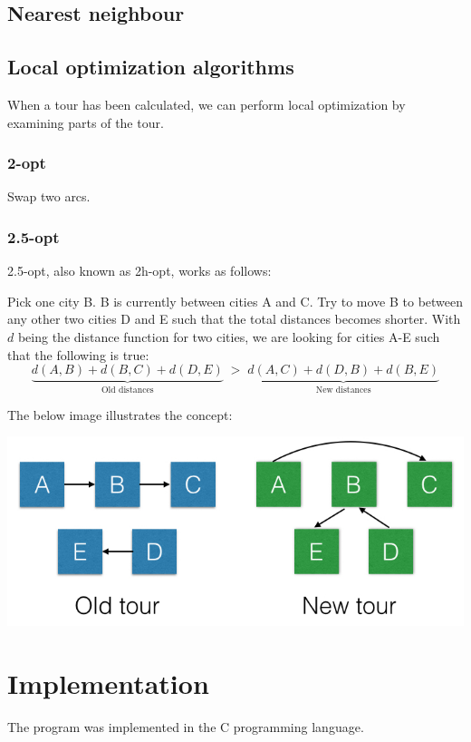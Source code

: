 \documentclass[paper=a4, fontsize=11pt,numbers=endperiod]{scrartcl} %
\numberwithin{equation}{section} %
\numberwithin{figure}{section} %
\numberwithin{table}{section} %
\begin{document}
\subsection{Nearest neighbour}

\subsection{Local optimization algorithms}
When a tour has been calculated, we can perform local optimization by examining parts of the tour.

\subsubsection{2-opt}
Swap two arcs.

\subsubsection{2.5-opt}
2.5-opt, also known as 2h-opt, works as follows:

Pick one city B. B is currently between cities A and C. Try to move B to between any other two cities D and E such that the total distances becomes shorter. With $d$ being the distance function for two cities, we are looking for cities A-E such that the following is true:
\[
    \underbrace{d(A,B) + d(B,C) + d(D,E)}_\text{Old distances}\; > \;\underbrace{d(A,C) + d(D,B) + d(B,E)}_\text{New distances}
\]

The below image illustrates the concept:

\begin{center}
\includegraphics[scale=0.4]{25opt}
\end{center}



\section{Implementation}
The program was implemented in the C programming language.
\end{document}
